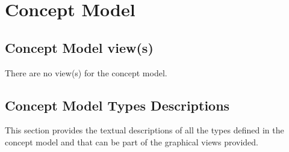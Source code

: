 
\chapter{Concept Model}
\label{chap:lu.uni.lassy.excalibur.group09.spec-CM}

\section{Concept Model view(s)}		
There are no view(s) for the \msrmessir concept model.











\section{Concept Model Types Descriptions}
This section provides the textual descriptions of all the types defined in the concept model and that can be part of the graphical views provided.












